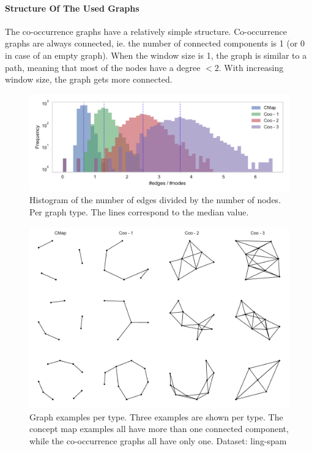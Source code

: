 
\paragraph{Structure Of The Used Graphs}
The co-occurrence graphs have a relatively simple structure.
Co-occurrence graphs are always connected, ie. the number of connected components is 1 (or 0 in case of an empty graph).
When the window size is 1, the graph is similar to a path, meaning that most of the nodes have a degree $< 2$. With increasing window size, the graph gets more connected.

\begin{figure}[h]
\centering
\includegraphics[width=0.7\linewidth]{assets/figures/hist-edgesnodes.pdf}
\caption{Histogram of the number of edges divided by the number of nodes. Per graph type. The lines correspond to the median value.}
\label{fig:histogram-edges-div-nodes-per-type}
\end{figure}

\begin{figure}[h]
\centering
\includegraphics[width=0.6\linewidth]{assets/figures/graph-examples.pdf}
\caption{Graph examples per type. Three examples are shown per type. The concept map examples all have more than one connected component, while the co-occurrence graphs all have only one. Dataset: ling-spam}
\end{figure}

